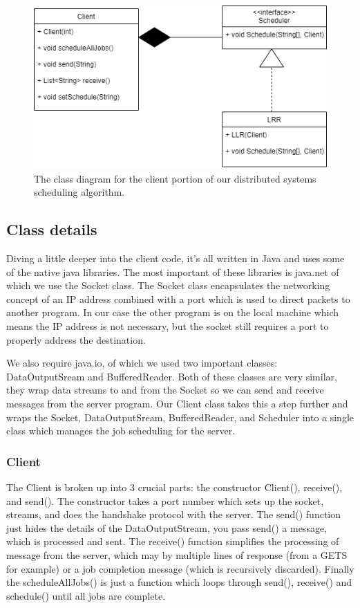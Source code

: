 \documentclass[a4paper]{article} %
\begin{document}
\begin{figure}
    \centering
    \includegraphics{class.png}
    \caption{The class diagram for the client portion of our distributed systems scheduling algorithm.}
    \label{fig:class}
\end{figure}

\subsection{Class details}

Diving a little deeper into the client code, it’s all written in Java and uses some of the native java libraries. The most important of these libraries is java.net of which we use the Socket\cite{socket} class. The Socket class encapsulates the networking concept of an IP address combined with a port which is used to direct packets to another program. In our case the other program is on the local machine which means the IP address is not necessary, but the socket still requires a port to properly address the destination.\par
We also require java.io, of which we used two important classes: DataOutputSream\cite{out} and BufferedReader\cite{read}. Both of these classes are very similar, they wrap data streams to and from the Socket so we can send and receive messages from the server program. Our Client class takes this a step further and wraps the Socket, DataOutputSream, BufferedReader, and Scheduler into a single class which manages the job scheduling for the server.
\subsubsection{Client}
The Client is broken up into 3 crucial parts: the constructor Client(), receive(), and send(). The constructor takes a port number which sets up the socket, streams, and does the handshake protocol with the server. The send() function just hides the details of the DataOutputStream, you pass send() a message, which is processed and sent. The receive() function simplifies the processing of message from the server, which may by multiple lines of response (from a GETS for example) or a job completion message (which is recursively discarded). Finally the scheduleAllJobs() is just a function which loops through send(), receive() and schedule() until all jobs are complete.\par
\end{document}
